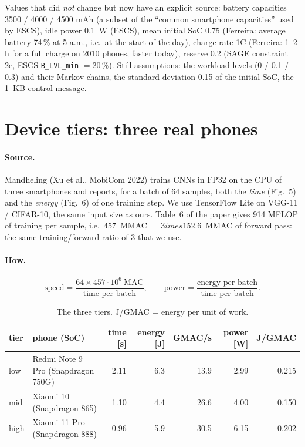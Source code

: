 \documentclass[11pt,a4paper]{article}
\begin{document}
Values that did \emph{not} change but now have an explicit source:
battery capacities 3500 / 4000 / 4500 mAh (a subset of the ``common smartphone
capacities'' used by ESCS), idle power \SI{0.1}{\watt} (ESCS), mean initial SoC
0.75 (Ferreira: average battery 74\,\% at 5 a.m., i.e.\ at the start of the
day), charge rate 1C (Ferreira: 1--2\,h for a full charge on 2010 phones,
faster today), reserve 0.2 (SAGE constraint 2e, ESCS \texttt{B\_LVL\_min} $=20\,\%$).
Still assumptions: the workload levels (0 / 0.1 / 0.3) and their Markov
chains, the standard deviation 0.15 of the initial SoC, the 1~KB control
message.

\section{Device tiers: three real phones}

\paragraph{Source.} Mandheling (Xu et al., MobiCom 2022) trains CNNs in FP32 on
the CPU of three smartphones and reports, for a batch of 64 samples, both the
\emph{time} (Fig.~5) and the \emph{energy} (Fig.~6) of one training step. We
use TensorFlow Lite on VGG-11 / CIFAR-10, the same input size as ours.
Table~6 of the paper gives 914 MFLOP of training per sample, i.e.\
457~MMAC $= 3 	imes 152.6$~MMAC of forward pass: the same
training/forward ratio of 3 that we use.

\paragraph{How.}
\[
\text{speed} = \frac{64 \times 457\cdot 10^{6}\ \text{MAC}}{\text{time per batch}},
\qquad
\text{power} = \frac{\text{energy per batch}}{\text{time per batch}} .
\]

\begin{table}[H]
\centering
\caption{The three tiers. J/GMAC = energy per unit of work.}
\begin{tabular}{llrrrrr}
\toprule
tier & phone (SoC) & time [s] & energy [J] & GMAC/s & power [W] & J/GMAC \\
\midrule
low  & Redmi Note 9 Pro (Snapdragon 750G) & 2.11 & 6.3 & 13.9 & 2.99 & 0.215 \\
mid  & Xiaomi 10 (Snapdragon 865)         & 1.10 & 4.4 & 26.6 & 4.00 & 0.150 \\
high & Xiaomi 11 Pro (Snapdragon 888)     & 0.96 & 5.9 & 30.5 & 6.15 & 0.202 \\
\bottomrule
\end{tabular}
\end{table}
\end{document}
